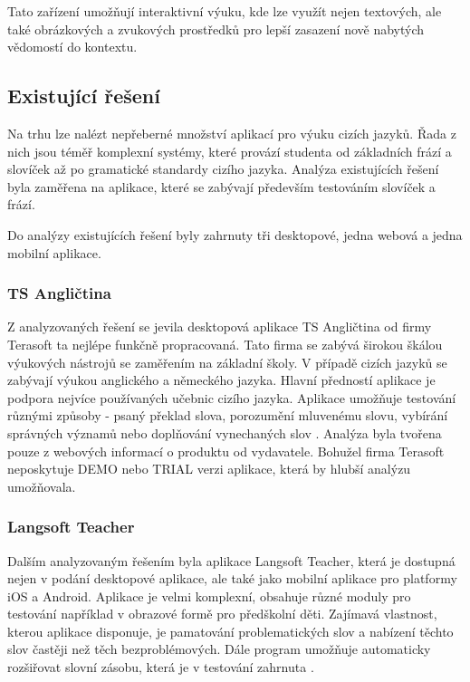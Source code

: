 \documentclass[a4paper,11pt,titlepage,fleqn]{article}
\begin{document}
            Tato zařízení umožňují interaktivní výuku, kde lze využít nejen textových, ale také obrázkových a zvukových prostředků pro lepší zasazení nově nabytých vědomostí do kontextu. 


    \subsection{Existující řešení}
        Na trhu lze nalézt nepřeberné množství aplikací pro výuku cizích jazyků. Řada z nich jsou téměř komplexní systémy, které provází studenta od základních frází a slovíček až po gramatické standardy cizího jazyka. Analýza existujících řešení byla zaměřena na aplikace, které se zabývají především testováním slovíček a frází.

        Do analýzy existujících řešení byly zahrnuty tři desktopové, jedna webová a jedna mobilní aplikace.

        \subsubsection{TS Angličtina}
            Z analyzovaných řešení se jevila desktopová aplikace TS Angličtina od firmy Terasoft ta nejlépe funkčně propracovaná. Tato firma se zabývá širokou škálou výukových nástrojů se zaměřením na základní školy. V případě cizích jazyků se zabývají výukou anglického a německého jazyka. Hlavní předností aplikace je podpora nejvíce používaných učebnic cizího jazyka. Aplikace umožňuje testování různými způsoby - psaný překlad slova, porozumění mluvenému slovu, vybírání správných významů nebo doplňování vynechaných slov \cite{bib:terasoft}. Analýza byla tvořena pouze z webových informací o produktu od vydavatele. Bohužel firma Terasoft neposkytuje DEMO nebo TRIAL verzi aplikace, která by hlubší analýzu umožňovala.

        \subsubsection{Langsoft Teacher}
            Dalším analyzovaným řešením byla aplikace Langsoft Teacher, která je dostupná nejen v podání desktopové aplikace, ale také jako mobilní aplikace pro platformy iOS a Android. Aplikace je velmi komplexní, obsahuje různé moduly pro testování například v obrazové formě pro předškolní děti. Zajímavá vlastnost, kterou aplikace disponuje, je pamatování problematických slov a nabízení těchto slov častěji než těch bezproblémových. Dále program umožňuje automaticky rozšiřovat slovní zásobu, která je v testování zahrnuta \cite{bib:langsoft}.
\end{document}

